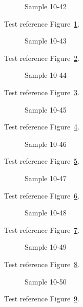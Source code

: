\begin{figure}[tbhp]
\caption{Sample 10-42}
\label{fig:sample-10-42}
\end{figure}

Test reference Figure~\ref{fig:sample-10-42}.

\begin{figure}[tbhp]
\caption{Sample 10-43}
\label{fig:sample-10-43}
\end{figure}

Test reference Figure~\ref{fig:sample-10-43}.

\begin{figure}[tbhp]
\caption{Sample 10-44}
\label{fig:sample-10-44}
\end{figure}

Test reference Figure~\ref{fig:sample-10-44}.

\begin{figure}[tbhp]
\caption{Sample 10-45}
\label{fig:sample-10-45}
\end{figure}

Test reference Figure~\ref{fig:sample-10-45}.

\begin{figure}[tbhp]
\caption{Sample 10-46}
\label{fig:sample-10-46}
\end{figure}

Test reference Figure~\ref{fig:sample-10-46}.

\begin{figure}[tbhp]
\caption{Sample 10-47}
\label{fig:sample-10-47}
\end{figure}

Test reference Figure~\ref{fig:sample-10-47}.

\begin{figure}[tbhp]
\caption{Sample 10-48}
\label{fig:sample-10-48}
\end{figure}

Test reference Figure~\ref{fig:sample-10-48}.

\begin{figure}[tbhp]
\caption{Sample 10-49}
\label{fig:sample-10-49}
\end{figure}

Test reference Figure~\ref{fig:sample-10-49}.

\begin{figure}[tbhp]
\caption{Sample 10-50}
\label{fig:sample-10-50}
\end{figure}

Test reference Figure~\ref{fig:sample-10-50}.

